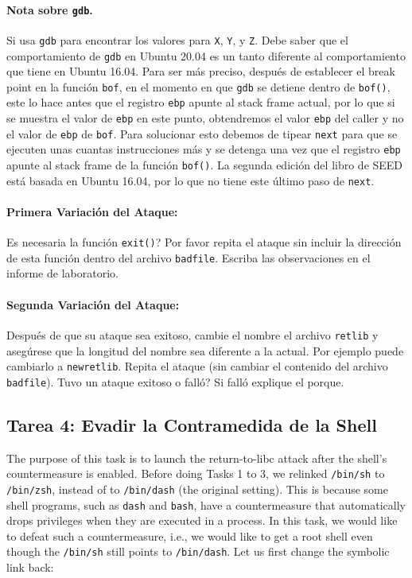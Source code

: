 \paragraph{Nota sobre \texttt{gdb}.} Si usa \texttt{gdb} para encontrar los valores para \texttt{X}, \texttt{Y}, y \texttt{Z}. Debe saber que el comportamiento de \texttt{gdb} en Ubuntu 20.04 es un tanto diferente al comportamiento que tiene en Ubuntu 16.04. Para ser más preciso, después de establecer el break point en la función \texttt{bof}, en el momento en que \texttt{gdb} se detiene dentro de \texttt{bof()}, este lo hace antes que el registro \texttt{ebp} apunte al stack frame actual, por lo que si se muestra el valor de \texttt{ebp} en este punto, obtendremos el valor \texttt{ebp} del caller y no el valor de \texttt{ebp} de \texttt{bof}. Para solucionar esto debemos de tipear \texttt{next} para que se ejecuten unas cuantas instrucciones más y se detenga una vez que el registro \texttt{ebp} apunte al stack frame de la función \texttt{bof()}.
La segunda edición del libro de SEED está basada en Ubuntu 16.04, por lo que no tiene este último paso de \texttt{next}.


\paragraph{Primera Variación del Ataque:}
Es necesaria la función \texttt{exit()}? Por favor repita el ataque sin incluir la dirección de esta función dentro del archivo \texttt{badfile}. Escriba las observaciones en el informe de laboratorio.


\paragraph{Segunda Variación del Ataque:} 
Después de que su ataque sea exitoso, cambie el nombre el archivo \texttt{retlib} y asegúrese que la longitud del nombre sea diferente a la actual. Por ejemplo puede cambiarlo a \texttt{newretlib}. Repita el ataque (sin cambiar el contenido del archivo {\tt badfile}). 
Tuvo un ataque exitoso o falló? Si falló explique el porque.

\subsection{Tarea 4: Evadir la Contramedida de la Shell}

The purpose of this task is to launch the return-to-libc attack after 
the shell's countermeasure is enabled. 
Before doing Tasks 1 to 3, we relinked \texttt{/bin/sh} to \texttt{/bin/zsh},
instead of to \texttt{/bin/dash} (the original setting). This is because some shell programs, such 
as \texttt{dash} and \texttt{bash}, have a countermeasure that automatically 
drops privileges when they are executed in a \setuid process. In this task, we 
would like to defeat such a countermeasure, i.e., we would like to get a root shell even though
the \texttt{/bin/sh} still points to \texttt{/bin/dash}.   
Let us first change the symbolic link back:

